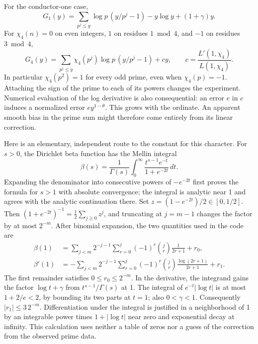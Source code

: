\documentclass[12pt,letterpaper]{article}
\begin{document}
For the conductor-one case,
\[
 G_1(y)=\sum_{p^j\le y}\log p\,(y/p^j-1)
                   -y\log y+(1+\gamma)y .
\]
For \(\chi_4(n)=0\) on even integers, \(1\) on residues \(1\bmod4\), and \(-1\) on residues \(3\bmod4\),
\[
 G_4(y)=\sum_{p^j\le y}\chi_4(p^j)\log p\,(y/p^j-1)+cy,
 \qquad c=\frac{L'(1,\chi_4)}{L(1,\chi_4)}.
\]
In particular \(\chi_4(p^2)=1\) for every odd prime, even when \(\chi_4(p)=-1\). Attaching the sign of the prime to each of its powers changes the experiment. Numerical evaluation of the log derivative is also consequential: an error \(e\) in \(c\) induces a normalized error \(e y^{1-\theta}\). This grows with the ordinate. An apparent smooth bias in the prime sum might therefore come entirely from its linear correction.

Here is an elementary, independent route to the constant for this character. For \(s>0\), the Dirichlet beta function has the Mellin integral
\[
 \beta(s)=\frac1{\Gamma(s)}
       \int_0^\infty \frac{t^{s-1}e^{-t}}{1+e^{-2t}}\,dt .
\]
Expanding the denominator into consecutive powers of \(-e^{-2t}\) first proves the formula for \(s>1\) with absolute convergence; the integral is analytic near 1 and agrees with the analytic continuation there. Set \(z=(1-e^{-2t})/2\in[0,1/2]\). Then \((1+e^{-2t})^{-1}=\tfrac12\sum_{j\ge0}z^j\), and truncating at \(j=m-1\) changes the factor by at most \(2^{-m}\). After binomial expansion, the two quantities used in the code are
\begin{align*}
  \beta(1)&=\sum_{j<m}2^{-j-1}
       \sum_{r=0}^j(-1)^r{j\choose r}\frac1{2r+1}+r_0,\\
  \beta'(1)&=-\sum_{j<m}2^{-j-1}
       \sum_{r=0}^j(-1)^r{j\choose r}\frac{\log(2r+1)}{2r+1}+r_1 .
\end{align*}
The first remainder satisfies \(0\le r_0\le2^{-m}\). In the derivative, the integrand gains the factor \(\log t+\gamma\) from \(t^{s-1}/\Gamma(s)\) at 1. The integral of \(e^{-t}|\log t|\) is at most \(1+2/e<2\), by bounding its two parts at \(t=1\); also \(0<\gamma<1\). Consequently \(|r_1|\le3\,2^{-m}\). Differentiation under the integral is justified in a neighborhood of 1 by an integrable power times \(1+|\log t|\) near zero and exponential decay at infinity. This calculation uses neither a table of zeros nor a guess of the correction from the observed prime data.
\end{document}
